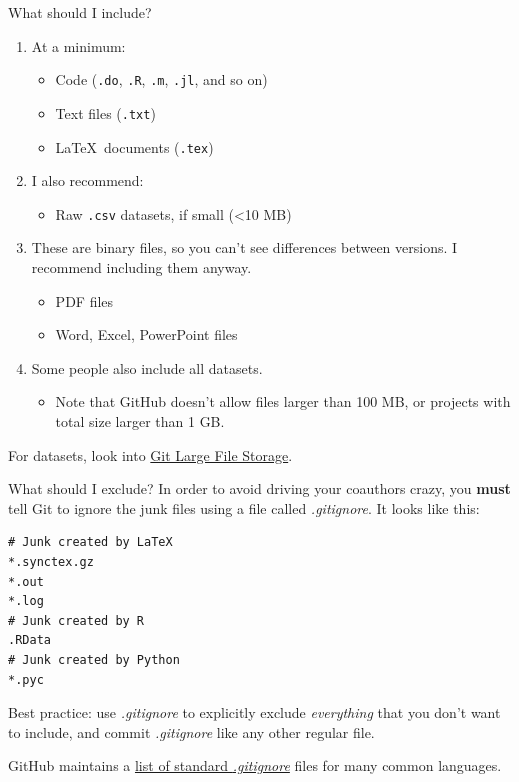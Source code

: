 \documentclass{beamer}
\begin{document}
\begin{frame}{What should I include?}
\begin{enumerate}
\item At a minimum:
\begin{itemize}
\item Code (\texttt{.do}, \texttt{.R}, \texttt{.m}, \texttt{.jl}, and so on)
\item Text files (\texttt{.txt})
\item \LaTeX \, documents (\texttt{.tex})
\end{itemize}
\item I also recommend:
\begin{itemize}
\item Raw \texttt{.csv} datasets, if small (\textless 10 MB)
\end{itemize}
\item These are binary files, so you can't see differences between versions. I recommend including them anyway.
\begin{itemize}
\item PDF files
\item Word, Excel, PowerPoint files
\end{itemize}
\item Some people also include all datasets.
\begin{itemize}
\item Note that GitHub doesn't allow files larger than 100 MB, or projects with total size larger than 1 GB.
\end{itemize}
\end{enumerate}

For datasets, look into \href{https://git-lfs.github.com/}{Git Large File Storage}.
\end{frame}

\begin{frame}[fragile]{What should I exclude?}
In order to avoid driving your coauthors crazy, you \textbf{must} tell Git to ignore the junk files using a file called \textit{.gitignore}. It looks like this:

\begin{verbatim}
# Junk created by LaTeX
*.synctex.gz
*.out
*.log
# Junk created by R
.RData
# Junk created by Python
*.pyc
\end{verbatim}

Best practice: use \textit{.gitignore} to explicitly exclude \textit{everything} that you don't want to include, and commit \textit{.gitignore} like any other regular file.

GitHub maintains a \href{https://help.github.com/articles/ignoring-files/}{list of standard \textit{.gitignore}} files for many common languages.
\end{frame}
\end{document}

